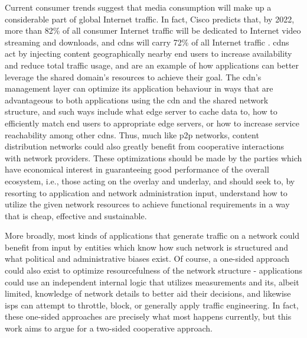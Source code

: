     Current consumer trends suggest that media consumption will make up a considerable part of global Internet traffic.
    In fact, Cisco predicts that, by 2022, more than 82\% of all consumer Internet traffic will be dedicated to Internet video streaming and downloads, and \glspl{cdn} will carry 72\% of all Internet traffic \cite{cisco2019}.
    \glspl{cdn} act by injecting content geographically nearby end users to increase availability and reduce total traffic usage, and are an example of how applications can better leverage the shared domain's resources to achieve their goal.
    The \gls{cdn}'s management layer can optimize its application behaviour in ways that are advantageous to both applications using the \gls{cdn} and the shared network structure, and such ways include what edge server to cache data to, how to efficiently match end users to appropriate edge servers, or how to increase service reachability among other \glspl{cdn}.
    Thus, much like \gls{p2p} networks, content distribution networks could also greatly benefit from cooperative interactions with network providers.
    These optimizations should be made by the parties which have economical interest in guaranteeing good performance of the overall ecosystem, i.e., those acting on the overlay and underlay, and should seek to, by resorting to application and network administration input, understand how to utilize the given network resources to achieve functional requirements in a way that is cheap, effective and sustainable.

    More broadly, most kinds of applications that generate traffic on a network could benefit from input by entities which know how such network is structured and what political and administrative biases exist.
    Of course, a one-sided approach could also exist to optimize resourcefulness of the network structure - applications could use an independent internal logic that utilizes measurements and its, albeit limited, knowledge of network details to better aid their decisions, and likewise \glspl{isp} can attempt to throttle, block, or generally apply traffic engineering.
    In fact, these one-sided approaches are precisely what most happens currently, but this work aims to argue for a two-sided cooperative approach.

